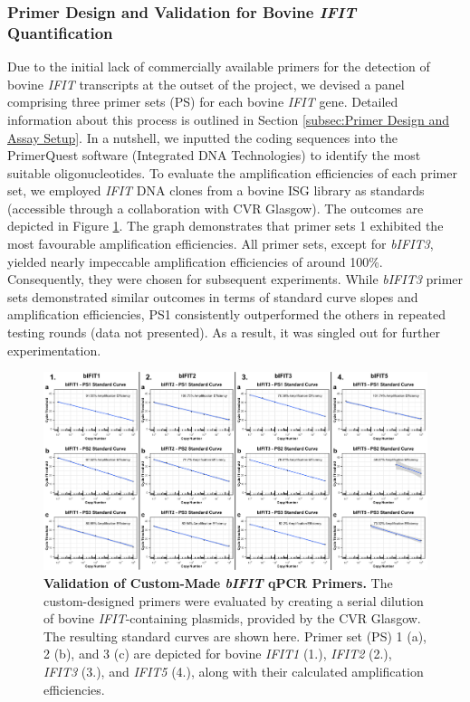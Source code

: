 \subsubsection{Primer Design and Validation for Bovine \textit{IFIT} Quantification} \label{Primer Design and Validation for Bovine IFIT Quantification}
Due to the initial lack of commercially available primers for the detection of bovine \textit{IFIT} transcripts at the outset of the project, we devised a panel comprising three primer sets (PS) for each bovine \textit{IFIT} gene. Detailed information about this process is outlined in Section \ref{subsec:Primer Design and Assay Setup}. In a nutshell, we inputted the coding sequences into the PrimerQuest software (Integrated DNA Technologies) to identify the most suitable oligonucleotides. To evaluate the amplification efficiencies of each primer set, we employed \textit{IFIT} DNA clones from a bovine ISG library as standards (accessible through a collaboration with CVR Glasgow). The outcomes are depicted in Figure \ref{fig:Validation of custom-made bIFIT qPCR primers}. The graph demonstrates that primer sets 1 exhibited the most favourable amplification efficiencies. All primer sets, except for \textit{bIFIT3}, yielded nearly impeccable amplification efficiencies of around 100\%. Consequently, they were chosen for subsequent experiments. While \textit{bIFIT3} primer sets demonstrated similar outcomes in terms of standard curve slopes and amplification efficiencies, PS1 consistently outperformed the others in repeated testing rounds (data not presented). As a result, it was singled out for further experimentation.

\begin{figure}
    \centering
    \includegraphics[width=1\linewidth]{07. Chapter 2/Figs/01. Technologies/02. primer validation.pdf}
    \caption[Validation of Custom-Made \textit{bIFIT} qPCR Primers.]{\textbf{Validation of Custom-Made \textit{bIFIT} qPCR Primers.} The custom-designed primers were evaluated by creating a serial dilution of bovine \textit{IFIT}-containing plasmids, provided by the CVR Glasgow. The resulting standard curves are shown here. Primer set (PS) 1 (a), 2 (b), and 3 (c) are depicted for bovine \textit{IFIT1} (1.), \textit{IFIT2} (2.), \textit{IFIT3} (3.), and \textit{IFIT5} (4.), along with their calculated amplification efficiencies.}
    \label{fig:Validation of custom-made bIFIT qPCR primers}
\end{figure}

